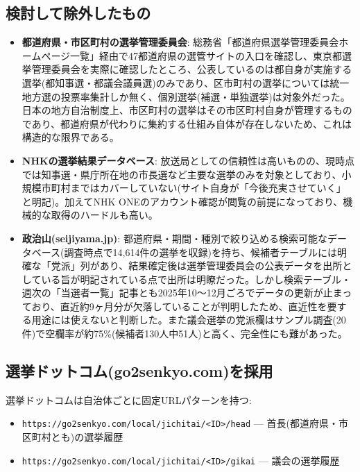 \documentclass[a4paper,11pt]{ltjsarticle}
\begin{document}
\subsection{検討して除外したもの}

\begin{itemize}
  \item \textbf{都道府県・市区町村の選挙管理委員会}: 総務省「都道府県選挙管理委員会ホームページ一覧」経由で47都道府県の選管サイトの入口を確認し、東京都選挙管理委員会を実際に確認したところ、公表しているのは都自身が実施する選挙(都知事選・都議会議員選)のみであり、区市町村の選挙については統一地方選の投票率集計しか無く、個別選挙(補選・単独選挙)は対象外だった。日本の地方自治制度上、市区町村の選挙はその市区町村自身が管理するものであり、都道府県が代わりに集約する仕組み自体が存在しないため、これは構造的な限界である。
  \item \textbf{NHKの選挙結果データベース}: 放送局としての信頼性は高いものの、現時点では知事選・県庁所在地の市長選など主要な選挙のみを対象としており、小規模市町村まではカバーしていない(サイト自身が「今後充実させていく」と明記)。加えてNHK ONEのアカウント確認が閲覧の前提になっており、機械的な取得のハードルも高い。
  \item \textbf{政治山(seijiyama.jp)}: 都道府県・期間・種別で絞り込める検索可能なデータベース(調査時点で14,614件の選挙を収録)を持ち、候補者テーブルには明確な「党派」列があり、結果確定後は選挙管理委員会の公表データを出所としている旨が明記されている点で出所は明瞭だった。しかし検索テーブル・週次の「当選者一覧」記事とも2025年10〜12月ごろでデータの更新が止まっており、直近約9ヶ月分が欠落していることが判明したため、直近性を要する用途には使えないと判断した。また議会選挙の党派欄はサンプル調査(20件)で空欄率が約75\%(候補者130人中51人)と高く、完全性にも難があった。
\end{itemize}

\subsection{選挙ドットコム(go2senkyo.com)を採用}

選挙ドットコムは自治体ごとに固定URLパターンを持つ:

\begin{itemize}
  \item \texttt{https://go2senkyo.com/local/jichitai/<ID>/head} — 首長(都道府県・市区町村とも)の選挙履歴
  \item \texttt{https://go2senkyo.com/local/jichitai/<ID>/gikai} — 議会の選挙履歴
\end{itemize}
\end{document}
